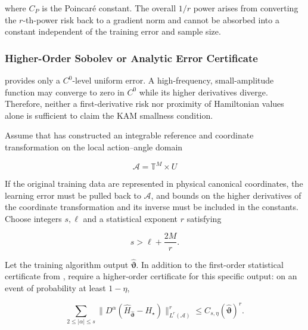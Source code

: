 where \(C_{P}\) is the Poincaré constant. The overall \(1/r\) power arises from converting the \(r\)-th-power risk back to a gradient norm and cannot be absorbed into a constant independent of the training error and sample size.

\subsubsection{Higher-Order Sobolev or Analytic Error Certificate}\label{sec:chnn-4-6-5}

 provides only a \(C^{0}\)-level uniform error. A high-frequency, small-amplitude function may converge to zero in \(C^{0}\) while its higher derivatives diverge. Therefore, neither a first-derivative risk nor proximity of Hamiltonian values alone is sufficient to claim the KAM smallness condition.

Assume that  has constructed an integrable reference and coordinate transformation on the local action--angle domain

\begin{equation}
\label{eq:chnn-4-50}
\mathcal{A} = \mathbb{T}^{M} \times U
\end{equation}

If the original training data are represented in physical canonical coordinates, the learning error must be pulled back to \(\mathcal{A}\), and bounds on the higher derivatives of the coordinate transformation and its inverse must be included in the constants. Choose integers \(s,\ell\) and a statistical exponent \(r\) satisfying

\begin{equation}
\label{eq:chnn-4-51}
s > \ell + \frac{2M}{r}.
\end{equation}

Let the training algorithm output \(\widehat{\bm{\vartheta}}\). In addition to the first-order statistical certificate from , require a higher-order certificate for this specific output: on an event of probability at least \(1-\eta\),

\begin{equation}
\label{eq:chnn-4-52}
\sum_{2 \leq |\alpha| \leq s}^{}\left. \parallel D^{\alpha}\left( {\widehat{H}}_{\widehat{\bm{\vartheta}}} - H_{\star} \right) \right.\parallel_{L^{r}\left( \mathcal{A} \right)}^{r} \leq C_{s,\eta}\left( \widehat{\bm{\vartheta}} \right)^{r}.
\end{equation}

